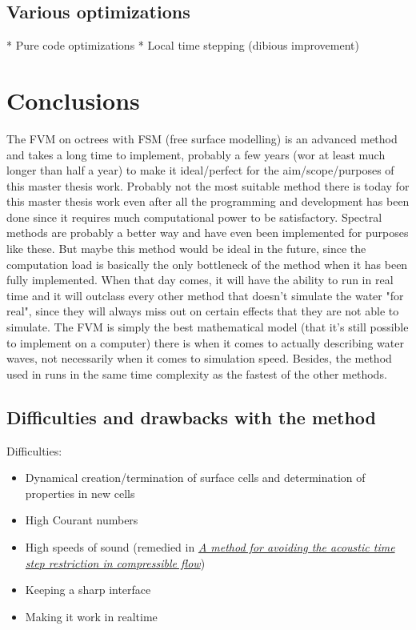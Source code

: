 \section{Various optimizations}

* Pure code optimizations
* Local time stepping (dibious improvement)

\chapter{Conclusions}

The FVM on octrees with FSM (free surface modelling) is an advanced method and takes a long time to implement, probably a few years (wor at least much longer than half a year) to make it ideal/perfect for the aim/scope/purposes of this master thesis work. Probably not the most suitable method there is today for this master thesis work even after all the programming and development has been done since it requires much computational power to be satisfactory. Spectral methods are probably a better way and have even been implemented for purposes like these. But maybe this method would be ideal in the future, since the computation load is basically the only bottleneck of the method when it has been fully implemented. When that day comes, it will have the ability to run in real time and it will outclass every other method that doesn't simulate the water "for real", since they will always miss out on certain effects that they are not able to simulate. The FVM is simply the best mathematical model (that it's still possible to implement on a computer) there is when it comes to actually describing water waves, not necessarily when it comes to simulation speed. Besides, the method used in \thisprojectwork runs in the same time complexity as the fastest of the other methods.

\section{Difficulties and drawbacks with the method}

Difficulties:
\begin{itemize}
    \item Dynamical creation/termination of surface cells and determination of properties in new cells
    \item High Courant numbers
    \item High speeds of sound (remedied in \textit{\href{http://physbam.stanford.edu/~kwatra/papers/compressible_semi_implicit/compressible_semi_implicit.pdf}{A method for avoiding the acoustic time step restriction in compressible flow}})
    \item Keeping a sharp interface
    \item Making it work in realtime
\end{itemize}